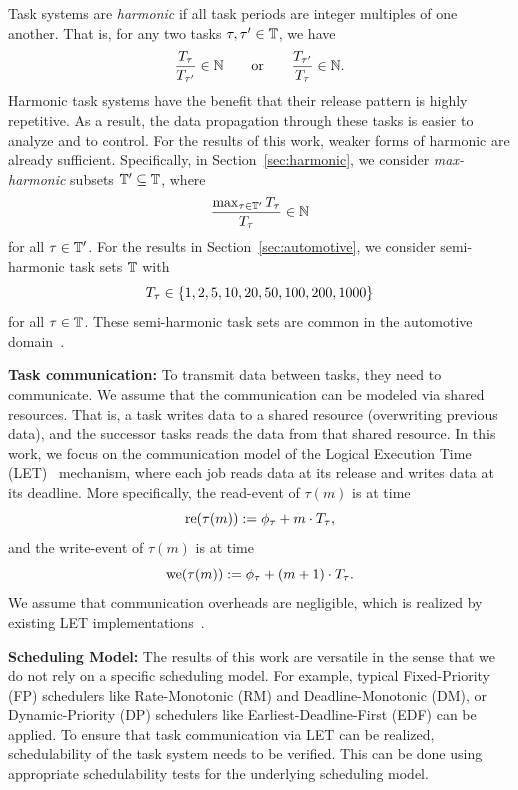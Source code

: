 \documentclass[10pt,conference]{resources/IEEEtran}
\theoremstyle{definition}
\begin{document}
	Task systems are \emph{harmonic} if all task periods are integer multiples of one another.
	That is, for any two tasks $\tau, \tau' \in \mathbb{T}$, we have 
	\begin{equation}
		\frac{T_{\tau}}{T_{\tau'}} \in \mathbb{N} \qquad \text{or} \qquad \frac{T_{\tau'}}{T_{\tau}} \in \mathbb{N}.
	\end{equation}
	Harmonic task systems have the benefit that their release pattern is highly repetitive. As a result, the data propagation through these tasks is easier to analyze and to control.
	For the results of this work, weaker forms of harmonic are already sufficient.
	Specifically, in Section~\ref{sec:harmonic}, we consider \emph{max-harmonic} subsets $\mathbb{T}' \subseteq \mathbb{T}$, where 
	\begin{equation}
		\frac{\max_{\tau\in \mathbb{T}'} T_{\tau}}{T_{\tau}} \in \mathbb{N}
	\end{equation}
	for all $\tau \in \mathbb{T}'$. 
	For the results in Section~\ref{sec:automotive}, we consider semi-harmonic task sets $\mathbb{T}$ with 
	\begin{equation}
		T_\tau \in \left\{{1,2,5,10,20,50,100,200,1000}\right\}
	\end{equation}
	for all $\tau \in \mathbb{T}$.
	These semi-harmonic task sets are common in the automotive domain~\cite{kramer2015real}.

	\smallskip
	\textbf{Task communication:}
	To transmit data between tasks, they need to communicate. 
	We assume that the communication can be modeled via shared resources. 
	That is, a task writes data to a shared resource (overwriting previous data), and the successor tasks reads the data from that shared resource. 
	In this work, we focus on the communication model of the Logical Execution Time (LET)~\cite{DBLP:conf/birthday/KirschS12} mechanism, where each job reads data at its release and writes data at its deadline.
	More specifically, the read-event of $\tau(m)$ is at time 
	\begin{equation}
		\operatorname{re} (\tau(m)) := \phi_{\tau} + m \cdot T_{\tau},
	\end{equation}
	and the write-event of $\tau(m)$ is at time 
	\begin{equation}
		\operatorname{we} (\tau(m)) := \phi_{\tau} + (m+1) \cdot T_{\tau}.
	\end{equation}
	We assume that communication overheads are negligible, which is realized by existing LET implementations~\cite{Biondi2018LET, Bellassai2023JSA7}.
	
	\smallskip
	\textbf{Scheduling Model:}
	The results of this work are versatile in the sense that we do not rely on a specific scheduling model.
	For example, typical Fixed-Priority (FP) schedulers like Rate-Monotonic (RM) and Deadline-Monotonic (DM), or Dynamic-Priority (DP) schedulers like Earliest-Deadline-First (EDF) can be applied. 
	To ensure that task communication via LET can be realized, schedulability of the task system needs to be verified. 
	This can be done using appropriate schedulability tests for the underlying scheduling model.
\end{document}
